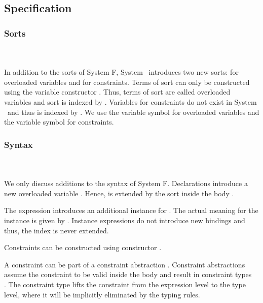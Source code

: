 \subsection{Specification}

\subsubsection{Sorts}\hfill\\\\
In addition to the sorts of System F, System \Fo\ introduces two new sorts:  for overloaded variables and  for constraints.
\FoSort
Terms of sort  can only be constructed using the variable constructor . Thus, terms of sort  are called overloaded variables and sort  is indexed by .
Variables for constraints do not exist in System \Fo\ and thus  is indexed by . 
We use the variable symbol  for overloaded variables and the variable symbol  for constraints. 

\subsubsection{Syntax}\hfill\\\\
We only discuss additions to the syntax of System F.
\FoTerm
Declarations   introduce a new overloaded variable . 
Hence,  is extended by the sort  inside the body . 

\noindent The expression   \Constr{=}    introduces an additional instance for . 
The actual meaning for the instance is given by .
Instance expressions do not introduce new bindings and thus, the index  is never extended.

\noindent Constraints  can be constructed using constructor  \Constr{:} . 

\noindent A constraint  can be part of a constraint abstraction \Constr{\lambdabar}   . Constraint abstractions assume the constraint  to be valid inside the body  and result in constraint types \\ \Constr{[}  \Constr{]⇒} . The constraint type lifts the constraint from the expression level to the type level, where it will be implicitly eliminated by the typing rules.


